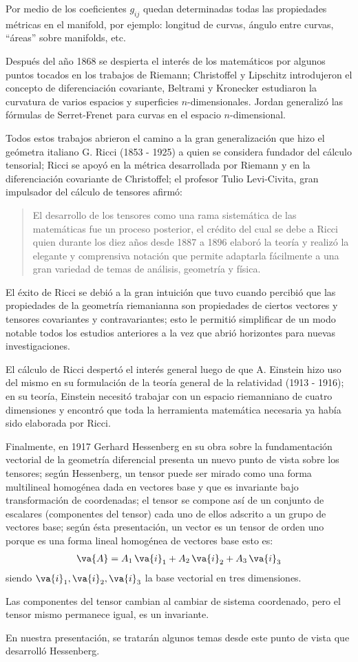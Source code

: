 Por medio de los coeficientes $g_{ij}$ quedan determinadas todas las propiedades métricas en el manifold, por ejemplo: longitud de curvas, ángulo entre curvas, \enquote{áreas} sobre manifolds, etc.
\par
Después del año 1868 se despierta el interés de los matemáticos por algunos puntos tocados en los trabajos de Riemann; Christoffel y Lipschitz introdujeron el concepto de diferenciación covariante, Beltrami y Kronecker estudiaron la curvatura de varios espacios y superficies $n$-dimensionales. Jordan generalizó las fórmulas de Serret-Frenet para curvas en el espacio $n$-dimensional.
\par
 Todos estos trabajos abrieron el camino a la gran generalización que hizo el geómetra italiano G. Ricci (1853 - 1925) a quien se considera fundador del cálculo tensorial; Ricci se apoyó en la métrica desarrollada por Riemann y en la diferenciación covariante de Christoffel; el profesor Tulio Levi-Civita, gran impulsador del cálculo de tensores afirmó: \blockquote{El desarrollo de los tensores como una rama sistemática de las matemáticas fue un proceso posterior, el crédito del cual se debe a Ricci quien durante los diez años desde 1887 a 1896 elaboró la teoría y realizó la elegante y comprensiva notación que permite adaptarla fácilmente a una gran variedad de temas de análisis, geometría y física.}
 \par
 El éxito de Ricci se debió a la gran intuición que tuvo cuando percibió que las propiedades de la geometría riemanianna son propiedades de ciertos vectores y tensores covariantes y contravariantes; esto le permitió simplificar de un modo notable todos los estudios anteriores a la vez que abrió horizontes para nuevas investigaciones.
 \par
El cálculo de Ricci despertó el interés general luego de que A. Einstein hizo uso del mismo en su formulación de la teoría general de la relatividad (1913 - 1916); en su teoría, Einstein necesitó trabajar con un espacio riemanniano de cuatro
dimensiones y encontró que toda la herramienta matemática necesaria ya había sido elaborada por Ricci.
\par
Finalmente, en 1917 Gerhard Hessenberg en su obra sobre la fundamentación vectorial de la geometría diferencial presenta un nuevo punto de vista sobre los tensores; según Hessenberg, un tensor puede ser mirado como una forma multilineal
homogénea dada en vectores base y que es invariante bajo transformación de coordenadas; el tensor se compone así de un conjunto de escalares (componentes del tensor) cada uno de ellos adscrito a un grupo de vectores base; según ésta presentación, un vector es un tensor de orden uno porque es una forma lineal homogénea de vectores base esto es:
\begin{align*}
\va{A} =  A_{1} \, \va{i}_{1} + A_{2} \, \va{i}_{2} + A_{3} \, \va{i}_{3}
\end{align*}
siendo $\va{i}_{1}, \va{i}_{2}, \va{i}_{3}$ la base vectorial en tres dimensiones.
\par
Las componentes del tensor cambian al cambiar de sistema coordenado, pero el tensor mismo permanece igual, es un invariante.
\par
En nuestra presentación, se tratarán algunos temas desde este punto de vista que desarrolló Hessenberg.
\newpage
